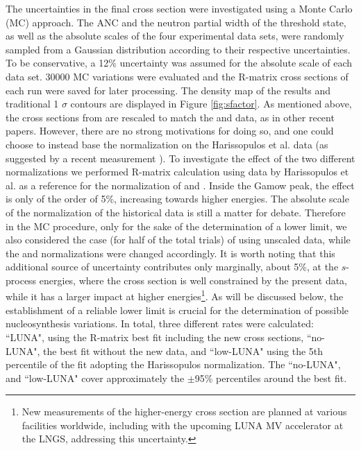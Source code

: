 \documentclass[%
reprint,
groupedaddress,
showpacs,
nofootinbib,
amsmath,amssymb,
aps,
prl,
superscriptaddress,
notitlepage,
floatfix
]{revtex4-2}
\begin{document}
The uncertainties in the final cross section were investigated using a Monte Carlo (MC) approach. The ANC and the neutron partial width of the threshold state, as well as the absolute scales of the four experimental data sets, were randomly sampled from a Gaussian distribution according to their respective uncertainties. To be conservative, a 12\% uncertainty was assumed for the absolute scale of each data set. 30000 MC variations were evaluated and the R-matrix cross sections of each run were saved for later processing. The density map of the results and traditional 1 $\sigma$ contours are displayed in Figure \ref{fig:sfactor}. 
As mentioned above, the cross sections from \cite{Harrisopulos:2005} are rescaled to match the \cite{Drotleff:1993} and \cite{Heil:2008a} data, as in other recent papers. However, there are no strong motivations for doing so, and one could choose to instead base the normalization on the Harissopulos et al. data (as suggested by a recent measurement \cite{Febbraro:2020}). To investigate the effect of the two different normalizations we performed R-matrix calculation using data by Harissopulos et al. as a reference for the normalization of \cite{Drotleff:1993} and  \cite{Heil:2008a}. Inside the Gamow peak, the effect is only of the order of 5\%, increasing towards higher energies.
The absolute scale of the normalization of the historical data is still a matter for debate.
Therefore in the MC procedure, only for the sake of the determination of a lower limit, we also considered the case (for half of the total trials) of using unscaled \citet{Harrisopulos:2005} data, while the \cite{Drotleff:1993} and \cite{Heil:2008a} normalizations were changed accordingly. It is worth noting that this additional source of uncertainty contributes only marginally, about 5\%, at the $s$-process energies, where the cross section is well constrained by the present data, while it has a larger impact at higher energies\footnote{New measurements of the higher-energy cross section are planned at various facilities worldwide, including with the upcoming LUNA MV accelerator at the LNGS\cite{Ferraro2021Fr}, addressing this uncertainty.}.
As will be discussed below, the establishment of a reliable lower limit is crucial for the determination of possible nucleosynthesis variations.
In total, three different rates were calculated: ``LUNA", using the R-matrix best fit including the new cross sections, ``no-LUNA", the best fit without the new data, and ``low-LUNA" using the 5th percentile of the fit adopting the Harissopulos normalization. The ``no-LUNA", and ``low-LUNA" cover approximately the $\pm$95\% percentiles around the best fit.
\end{document}
